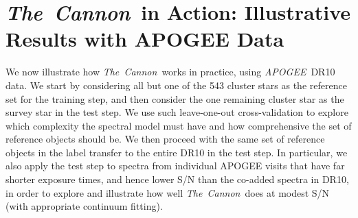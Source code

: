 \documentclass[12pt, preprint]{aastex}
\newcommand{\tc}{\textsl{The~Cannon}}
\newcommand{\apogee}{\textsl{APOGEE}}
\begin{document}
\section{\tc\ in Action: Illustrative Results with APOGEE Data}
\label{sec:results}


We now illustrate how \tc\ works in practice, using \apogee\ DR10 data.
We start by considering all but one of the 543 cluster stars as the reference set for the training step, and then consider the one remaining cluster star as the survey star in the test step. We use such leave-one-out cross-validation to explore which complexity the spectral model must have and how comprehensive the set of reference objects should be. We then proceed with the same set of reference objects in the label transfer to the entire DR10 in the test step. In particular, we also apply the test step to spectra from individual APOGEE visits that have far shorter exposure times, and hence lower S/N than the co-added spectra in DR10, in order to explore and illustrate how well \tc\ does at modest S/N (with appropriate continuum fitting).


\end{document}

